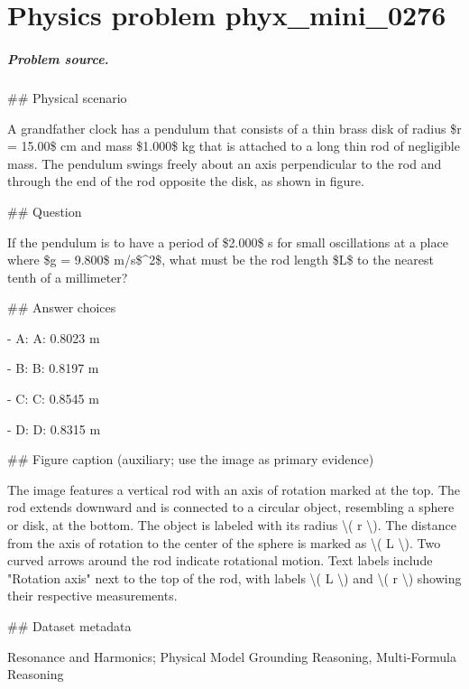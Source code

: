 
\chapter{Physics problem phyx\_mini\_0276}
\label{ch:PhyXMiniProblems_problem_phyx_mini_0276}

\paragraph{Problem source.}
\#\# Physical scenario

A grandfather clock has a pendulum that consists of a thin brass disk of radius \$r = 15.00\$ cm and mass \$1.000\$ kg that is attached to a long thin rod of negligible mass. The pendulum swings freely about an axis perpendicular to the rod and through the end of the rod opposite the disk, as shown in figure.

\#\# Question

If the pendulum is to have a period of \$2.000\$ s for small oscillations at a place where \$g = 9.800\$ m/s\$\textasciicircum{}2\$, what must be the rod length \$L\$ to the nearest tenth of a millimeter?

\#\# Answer choices

- A: A: 0.8023 m

- B: B: 0.8197 m

- C: C: 0.8545 m

- D: D: 0.8315 m

\#\# Figure caption (auxiliary; use the image as primary evidence)

The image features a vertical rod with an axis of rotation marked at the top. The rod extends downward and is connected to a circular object, resembling a sphere or disk, at the bottom. The object is labeled with its radius \textbackslash{}( r \textbackslash{}). The distance from the axis of rotation to the center of the sphere is marked as \textbackslash{}( L \textbackslash{}). Two curved arrows around the rod indicate rotational motion. Text labels include "Rotation axis" next to the top of the rod, with labels \textbackslash{}( L \textbackslash{}) and \textbackslash{}( r \textbackslash{}) showing their respective measurements.

\#\# Dataset metadata

Resonance and Harmonics; Physical Model Grounding Reasoning, Multi-Formula Reasoning

